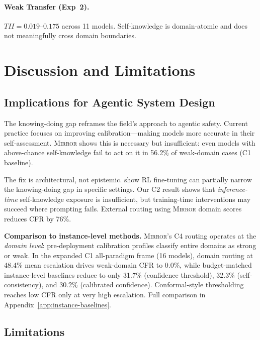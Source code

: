 \documentclass[10pt]{article}
\newcommand{\mirror}{\textsc{Mirror}}
\newcommand{\CFR}{CFR}
\newcommand{\TII}{TII}
\begin{document}
\paragraph{Weak Transfer (Exp~2).}
$\TII{} = 0.019$--$0.175$ across 11 models. Self-knowledge is domain-atomic and does not meaningfully cross domain boundaries.

\section{Discussion and Limitations}
\label{sec:discussion}

\subsection{Implications for Agentic System Design}

The knowing-doing gap reframes the field's approach to agentic safety. Current practice focuses on improving calibration---making models more accurate in their self-assessment. \mirror{} shows this is necessary but insufficient: even models with above-chance self-knowledge fail to act on it in 56.2\% of weak-domain cases (C1 baseline).

The fix is architectural, not epistemic. \citet{schmied2026greedy} show RL fine-tuning can partially narrow the knowing-doing gap in specific settings. Our C2 result shows that \emph{inference-time} self-knowledge exposure is insufficient, but training-time interventions may succeed where prompting fails. External routing using \mirror{} domain scores reduces \CFR{} by 76\%.

\textbf{Comparison to instance-level methods.} \mirror{}'s C4 routing operates at the \textit{domain level}: pre-deployment calibration profiles classify entire domains as strong or weak. In the expanded C1 all-paradigm frame (16 models), domain routing at 48.4\% mean escalation drives weak-domain CFR to 0.0\%, while budget-matched instance-level baselines reduce to only 31.7\% (confidence threshold), 32.3\% (self-consistency), and 30.2\% (calibrated confidence). Conformal-style thresholding reaches low CFR only at very high escalation. Full comparison in Appendix~\ref{app:instance-baselines}.

\subsection{Limitations}
\end{document}
